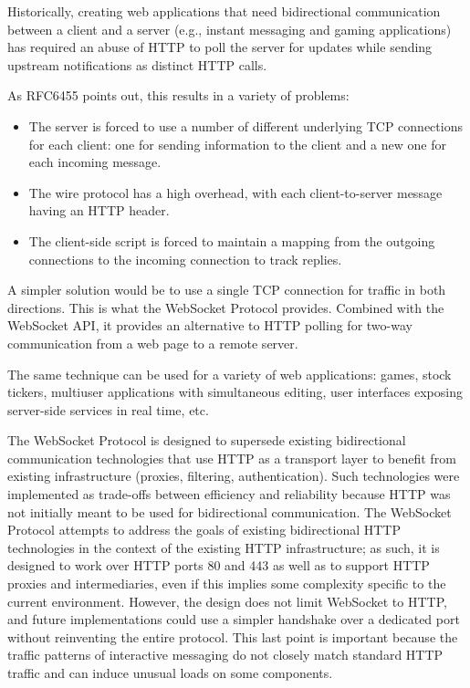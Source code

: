 Historically, creating web applications that need bidirectional communication
between a client and a server (e.g., instant messaging and gaming applications)
has required an abuse of HTTP to poll the server for updates while sending
upstream notifications as distinct HTTP calls.

As RFC6455\cite{websockets} points out, this results in a variety of problems:

\begin{itemize}

\item The server is forced to use a number of different underlying TCP
  connections for each client: one for sending information to the
  client and a new one for each incoming message.

\item The wire protocol has a high overhead, with each client-to-server
  message having an HTTP header.

\item The client-side script is forced to maintain a mapping from the
  outgoing connections to the incoming connection to track replies.

\end{itemize}

A simpler solution would be to use a single TCP connection for traffic in both
directions. This is what the WebSocket Protocol provides. Combined with the
WebSocket API, it provides an alternative to HTTP polling for two-way
communication from a web page to a remote server.

The same technique can be used for a variety of web applications: games, stock
tickers, multiuser applications with simultaneous editing, user interfaces
exposing server-side services in real time, etc.

The WebSocket Protocol is designed to supersede existing bidirectional
communication technologies that use HTTP as a transport layer to benefit from
existing infrastructure (proxies, filtering, authentication). Such technologies
were implemented as trade-offs between efficiency and reliability because HTTP
was not initially meant to be used for bidirectional communication. The
WebSocket Protocol attempts to address the goals of existing bidirectional HTTP
technologies in the context of the existing HTTP infrastructure; as such, it is
designed to work over HTTP ports 80 and 443 as well as to support HTTP proxies
and intermediaries, even if this implies some complexity specific to the current
environment. However, the design does not limit WebSocket to HTTP, and future
implementations could use a simpler handshake over a dedicated port without
reinventing the entire protocol. This last point is important because the
traffic patterns of interactive messaging do not closely match standard HTTP
traffic and can induce unusual loads on some components.

